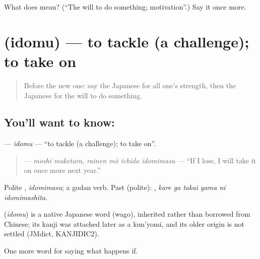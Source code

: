 \begin{tcolorbox}[breakable,colback=teal!4,colframe=teal!35!black,title={Before you move on}]
What does  mean? (\textquotedblleft{}The will to do something; motivation\textquotedblright{}.) Say it once more.
\end{tcolorbox}
\section[\texorpdfstring{\ja{いどむ} (idomu)}{いどむ (idomu)}]{ (idomu) — to tackle (a challenge); to take on}

\label{lesson:JA-C516-idomu}



\begin{quote}
Before the new one: say the Japanese for all one's strength, then the Japanese for the will to do something.
\end{quote}

\subsection*{You'll want to know: }
\textbf{} — \emph{idomu} — \textquotedblleft{}to tackle (a challenge); to take on\textquotedblright{}.

\begin{quote}
\textbf{    } — \emph{moshi maketara, rainen mō ichido idomimasu} — \textquotedblleft{}If I lose, I will take it on once more next year.\textquotedblright{}
\end{quote}

Polite \textbf{}, \emph{idomimasu}; a godan verb. Past (polite): \textbf{   }, \emph{kare ga takai yama ni idomimashita}.

\begin{cousinweb}
\textbf{} (\emph{idomu}) is a native Japanese word (wago), inherited rather than borrowed from Chinese; its kanji was attached later as a kun'yomi, and its older origin is not settled (JMdict, KANJIDIC2).
\end{cousinweb}

\begin{grammarlens}[title={What you've built}]
One more word for saying what happens if.
\end{grammarlens}

